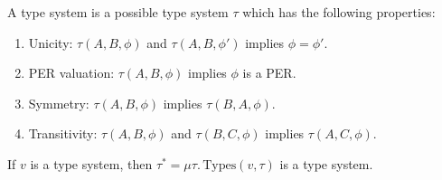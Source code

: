 A type system is a possible type system $\tau$ which has the following properties:
\begin{enumerate}
\item Unicity: $\tau(A,B,\phi)$ and $\tau(A,B,\phi')$ implies $\phi = \phi'$.
\item PER valuation: $\tau(A,B,\phi)$ implies $\phi$ is a PER.
\item Symmetry: $\tau(A,B,\phi)$ implies $\tau(B,A,\phi)$. 
\item Transitivity: $\tau(A,B,\phi)$ and $\tau(B,C,\phi)$ implies $\tau(A,C,\phi)$.
\end{enumerate}

\begin{lemma}
If $v$ is a type system, then $\tau^* = \mu \tau.\, \text{Types}(v,\tau)$ is a type system.
\end{lemma}

